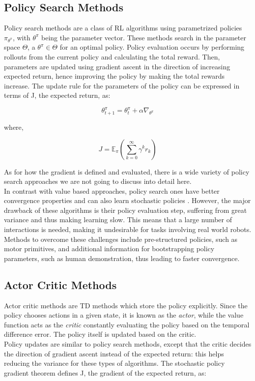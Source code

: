 \subsection{Policy Search Methods}

Policy search methods are a class of RL algorithms using parametrized policies $\pi_{\theta^\pi}$, with $\theta^\pi$ being the parameter vector. These methods search in the parameter space $\Theta$, a $\theta^\pi \in \Theta$ for an optimal policy. Policy evaluation occurs by performing rollouts from the current policy and calculating the total reward. Then, parameters are updated using gradient ascent in the direction of increasing expected return, hence improving the policy by making the total rewards increase. The update rule for the parameters of the policy can be expressed in terms of J, the expected return, as:

\begin{equation}
	\theta_{t+1}^\pi = \theta_t^\pi + \alpha \nabla_{\theta^\pi}
\end{equation}

where,

\begin{equation}
	J = \mathbb{E}_\pi (\sum_{k=0}^{\infty}\gamma^kr_k)
\end{equation}

As for how the gradient is defined and evaluated, there is a wide variety of policy search approaches we are not going to discuss into detail here.
\\
\indent In contrast with value based approaches, policy search ones have better convergence properties and can also learn stochastic policies . However, the major drawback of these algorithms is their policy evaluation step, suffering from great variance and thus making learning slow. This means that a large number of interactions is needed, making it undesirable for tasks involving real world robots. Methods to overcome these challenges include pre-structured policies, such as motor primitives, %
and additional information for bootstrapping policy parameters, such as human demonstration, thus leading to faster convergence.

\subsection{Actor Critic Methods}
\label{sec:actorcritic}

Actor critic methods\cite{konda2000actor} are TD methods which store the policy explicitly. Since the policy chooses actions in a given state, it is known as the \textit{actor}, while the value function acts as the \textit{critic} constantly evaluating the policy based on the temporal difference error. The policy itself is updated based on the critic. 
\\
\indent Policy updates are similar to policy search methods, except that the critic decides the direction of gradient ascent instead of the expected return: this helps reducing the variance for these types of algorithms. The stochastic policy gradient theorem defines J, the gradient of the expected return, as:


